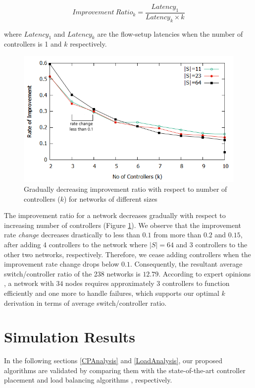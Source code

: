 \documentclass[a4paper,fleqn]{cas-dc}
\begin{document}
\begin{equation}
Improvement~Ratio_k = \frac{Latency_1}{Latency_k\times k}
\end{equation}

where $Latency_1$ and $Latency_k$ are the flow-setup latencies when the number of controllers is 1 and $k$ respectively.

\begin{figure}[t]
	\centering
	\includegraphics[width=0.95\linewidth]{Images/cutoff.png}
	\caption{Gradually decreasing improvement ratio with respect to number of controllers ($k$) for networks of different sizes} \label{fig:cutoff}
\end{figure}

The improvement ratio for a network decreases gradually with respect to increasing number of controllers (Figure \ref{fig:cutoff}). We observe that the improvement rate \textit{change} decreases drastically to less than $0.1$ from more than $0.2$ and $0.15$, after adding 4 controllers to the network where $|S|=64$ and 3 controllers to the other two networks, respectively. Therefore, we cease adding controllers when the improvement rate change drops below $0.1$. Consequently, the resultant average switch/controller ratio of the 238 networks is $12.79$. According to expert opinions \cite{heller2012latency}, a network with $34$ nodes requires approximately $3$ controllers to function efficiently and one more to handle failures, which supports our optimal $k$ derivation in terms of average switch/controller ratio.

\section{Simulation Results} \label{simulationResults}
In the following sections \ref{CPAnalysis} and \ref{LoadAnalysis}, our proposed algorithms are validated by comparing them with the state-of-the-art controller placement \cite{dbcp2017} and load balancing algorithms \cite{filali2018sdn}, respectively.
\end{document}
